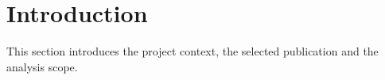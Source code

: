 \section{Introduction}

This section introduces the project context, the selected publication and the analysis scope.
